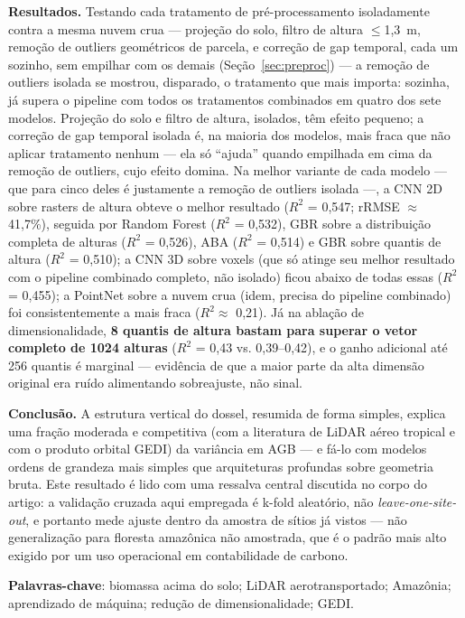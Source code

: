 \documentclass[article,12pt,oneside,a4paper]{abntex2}
\begin{document}
\begin{resumoumacoluna}
\textbf{Resultados.} Testando cada tratamento de pré-processamento isoladamente
contra a mesma nuvem crua --- projeção do solo, filtro de altura $\leq$1,3~m,
remoção de outliers geométricos de parcela, e correção de gap temporal, cada um
sozinho, sem empilhar com os demais (Seção~\ref{sec:preproc}) --- a remoção de
outliers isolada se mostrou, disparado, o tratamento que mais importa: sozinha,
já supera o pipeline com todos os tratamentos combinados em quatro dos sete
modelos. Projeção do solo e filtro de altura, isolados, têm efeito pequeno; a
correção de gap temporal isolada é, na maioria dos modelos, mais fraca que não
aplicar tratamento nenhum --- ela só ``ajuda'' quando empilhada em cima da
remoção de outliers, cujo efeito domina. Na melhor variante de cada modelo ---
que para cinco deles é justamente a remoção de outliers isolada ---, a CNN 2D
sobre rasters de altura obteve o melhor resultado ($R^2$ = 0,547;
rRMSE $\approx$ 41,7\%), seguida por Random Forest ($R^2$ = 0,532), GBR sobre a
distribuição completa de alturas ($R^2$ = 0,526), ABA ($R^2$ = 0,514) e GBR
sobre quantis de altura ($R^2$ = 0,510); a CNN 3D sobre voxels (que só atinge seu
melhor resultado com o pipeline combinado completo, não isolado) ficou abaixo de
todas essas ($R^2$ = 0,455); a PointNet sobre a nuvem crua (idem, precisa do
pipeline combinado) foi consistentemente a mais fraca ($R^2 \approx$ 0,21). Já na
ablação de dimensionalidade, \textbf{8 quantis de altura bastam para superar o
vetor completo de 1024 alturas} ($R^2$ = 0,43 vs. 0,39--0,42), e o ganho
adicional até 256 quantis é marginal --- evidência de que a maior parte da alta
dimensão original era ruído alimentando sobreajuste, não sinal.

\textbf{Conclusão.} A estrutura vertical do dossel, resumida de forma simples,
explica uma fração moderada e competitiva (com a literatura de LiDAR aéreo
tropical e com o produto orbital GEDI) da variância em AGB --- e fá-lo com
modelos ordens de grandeza mais simples que arquiteturas profundas sobre
geometria bruta. Este resultado é lido com uma ressalva central discutida no
corpo do artigo: a validação cruzada aqui empregada é k-fold aleatório, não
\textit{leave-one-site-out}, e portanto mede ajuste dentro da amostra de sítios
já vistos --- não generalização para floresta amazônica não amostrada, que é o
padrão mais alto exigido por um uso operacional em contabilidade de carbono.

\vspace{\onelineskip}
\noindent\textbf{Palavras-chave}: biomassa acima do solo; LiDAR aerotransportado;
Amazônia; aprendizado de máquina; redução de dimensionalidade; GEDI.
\end{resumoumacoluna}
\end{document}

